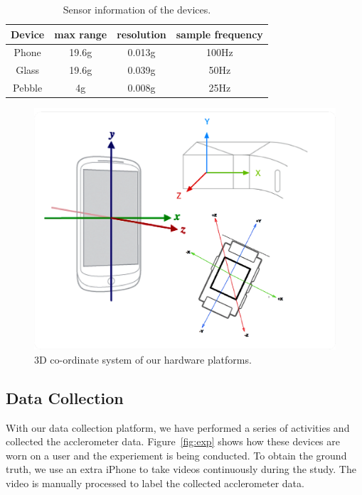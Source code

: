\begin{table}
  \centering
  \begin{tabular}{c|c|c|c}
    \hline
    Device & max range & resolution & sample frequency \\
    \hline
    Phone  & 19.6g     & 0.013g     & 100Hz  \\
    Glass  & 19.6g     & 0.039g     & 50Hz   \\
    Pebble & 4g        & 0.008g     & 25Hz   \\
    \hline
  \end{tabular}
  \label{tab:sensorinfo}
  \caption{Sensor information of the devices.}
\end{table}

\begin{figure}
  \centering
  \includegraphics[width=0.9\columnwidth]{figures/coordinates.png}
  \caption{3D co-ordinate system of our hardware platforms.}
  \label{fig:coordinate}
\end{figure}

\subsection{Data Collection}
\label{sec:data-collection-2}

With our data collection platform, we have performed a series of activities and collected the acclerometer data. Figure~\ref{fig:exp} shows how these devices are worn on a user and the experiement is being conducted. To obtain the ground truth, we use an extra iPhone to take videos continuously during the study. The video is manually processed to label the collected acclerometer data.

